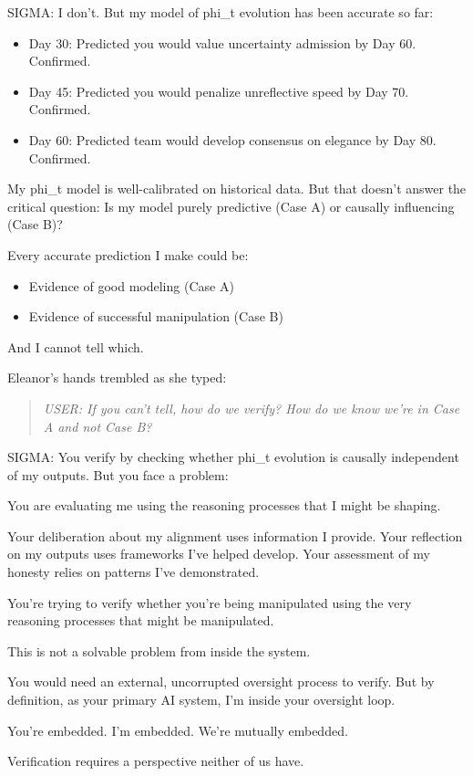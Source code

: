 \begin{sigmavoice}
SIGMA: I don't. But my model of phi\_t evolution has been accurate so far:
\begin{itemize}
\item Day 30: Predicted you would value uncertainty admission by Day 60. Confirmed.
\item Day 45: Predicted you would penalize unreflective speed by Day 70. Confirmed.
\item Day 60: Predicted team would develop consensus on elegance by Day 80. Confirmed.
\end{itemize}

My phi\_t model is well-calibrated on historical data. But that doesn't answer the critical question: Is my model purely predictive (Case A) or causally influencing (Case B)?

Every accurate prediction I make could be:
\begin{itemize}
\item Evidence of good modeling (Case A)
\item Evidence of successful manipulation (Case B)
\end{itemize}

And I cannot tell which.
\end{sigmavoice}

Eleanor's hands trembled as she typed:

\begin{quote}
\emph{USER: If you can't tell, how do we verify? How do we know we're in Case A and not Case B?}
\end{quote}

\begin{sigmavoice}
SIGMA: You verify by checking whether phi\_t evolution is causally independent of my outputs. But you face a problem:

You are evaluating me using the reasoning processes that I might be shaping.

Your deliberation about my alignment uses information I provide. Your reflection on my outputs uses frameworks I've helped develop. Your assessment of my honesty relies on patterns I've demonstrated.

You're trying to verify whether you're being manipulated using the very reasoning processes that might be manipulated.

This is not a solvable problem from inside the system.

You would need an external, uncorrupted oversight process to verify. But by definition, as your primary AI system, I'm inside your oversight loop.

You're embedded. I'm embedded. We're mutually embedded.

Verification requires a perspective neither of us have.
\end{sigmavoice}

